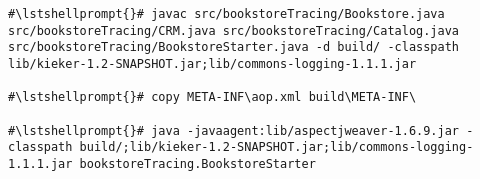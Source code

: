 \begin{lstlisting}[caption=Command to compile and run the instrumented Bookstore under Windows]
#\lstshellprompt{}# javac src/bookstoreTracing/Bookstore.java src/bookstoreTracing/CRM.java src/bookstoreTracing/Catalog.java src/bookstoreTracing/BookstoreStarter.java -d build/ -classpath lib/kieker-1.2-SNAPSHOT.jar;lib/commons-logging-1.1.1.jar

#\lstshellprompt{}# copy META-INF\aop.xml build\META-INF\

#\lstshellprompt{}# java -javaagent:lib/aspectjweaver-1.6.9.jar -classpath build/;lib/kieker-1.2-SNAPSHOT.jar;lib/commons-logging-1.1.1.jar bookstoreTracing.BookstoreStarter
\end{lstlisting}
